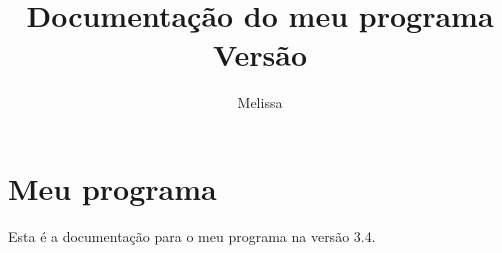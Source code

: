 \documentclass{article}
\title{Documentação do meu programa\\ Versão \versao}
\author{Melissa}
\newcommand{\versao}{3.4}
\begin{document}
\maketitle

\section{Meu programa}
Esta é a documentação para o meu programa na versão \versao.
\end{document}
